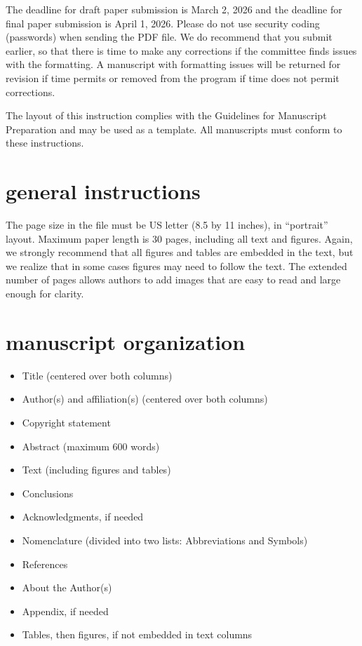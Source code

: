 \documentclass[10pt,twocolumn,twoside]{article}
\begin{document}
The deadline for draft paper submission is March 2, 2026 and the deadline for final
paper submission is April 1, 2026. Please do not use security coding (passwords) when sending the PDF file. We do recommend that you submit earlier, so that there is time to make any corrections if the committee finds issues with the formatting. A manuscript with formatting issues will be returned for revision if time permits or removed from the program if time does not permit corrections.

The layout of this instruction complies with the Guidelines for Manuscript Preparation and may be used as a template. All manuscripts must conform to these instructions.

\section{general instructions}
The page size in the file must be US letter (8.5 by 11 inches), in “portrait” layout. Maximum paper length is 30 pages, including all text and figures. Again, we strongly recommend that all figures and tables are embedded in the text, but we realize that in some cases figures may need to follow the text. The extended number of pages allows authors to add images that are easy to read and large enough for clarity.

\section{manuscript organization}
\begin{itemize}
    \item Title (centered over both columns)
    \item Author(s) and affiliation(s) (centered over both columns)
    \item Copyright statement
    \item Abstract (maximum 600 words)
    \item Text (including figures and tables)
    \item Conclusions
    \item Acknowledgments, if needed
    \item Nomenclature (divided into two lists: Abbreviations and Symbols)
    \item References
    \item About the Author(s)
    \item Appendix, if needed
    \item Tables, then figures, if not embedded in text columns
\end{itemize}
\end{document}

